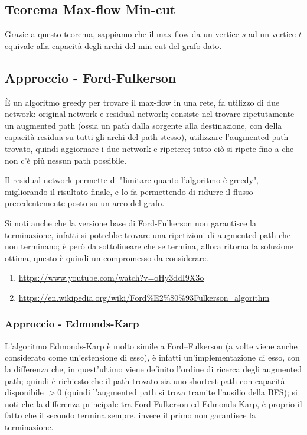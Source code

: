 \documentclass[12pt,a4paper]{article}
\begin{document}
\subsection{Teorema Max-flow Min-cut}
Grazie a questo teorema, sappiamo che il max-flow da un vertice $s$ ad un vertice $t$ equivale alla capacità degli archi del min-cut del grafo dato.

\subsection{Approccio - Ford-Fulkerson}
È un algoritmo greedy per trovare il max-flow in una rete, fa utilizzo di due network: original network e residual network; consiste nel trovare ripetutamente un augmented path (ossia un path dalla sorgente alla destinazione, con della capacità residua su tutti gli archi del path stesso), utilizzare l'augmented path trovato, quindi aggiornare i due network e ripetere; tutto ciò si ripete fino a che non c'è più nessun path possibile.

Il residual network permette di "limitare quanto l'algoritmo è greedy", migliorando il risultato finale, e lo fa permettendo di ridurre il flusso precedentemente posto su un arco del grafo.

Si noti anche che la versione base di Ford-Fulkerson non garantisce la terminazione, infatti si potrebbe trovare una ripetizioni di augmented path che non terminano; è però da sottolineare che se termina, allora ritorna la soluzione ottima, questo è quindi un compromesso da considerare.

\begin{enumerate}
\item \url{https://www.youtube.com/watch?v=oHy3ddI9X3o}
\item \url{https://en.wikipedia.org/wiki/Ford%E2%80%93Fulkerson_algorithm}
\end{enumerate}

\subsubsection{Approccio - Edmonds-Karp}
L'algoritmo Edmonds-Karp è molto simile a Ford–Fulkerson (a volte viene anche considerato come un'estensione di esso), è infatti un'implementazione di esso, con la differenza che, in quest'ultimo viene definito l'ordine di ricerca degli augmented path; quindi è richiesto che il path trovato sia uno shortest path con capacità disponibile $> 0$ (quindi l'augmented path si trova tramite l'ausilio della BFS); si noti che la differenza principale tra Ford-Fulkerson ed Edmonds-Karp, è proprio il fatto che il secondo termina sempre, invece il primo non garantisce la terminazione.
\end{document}
